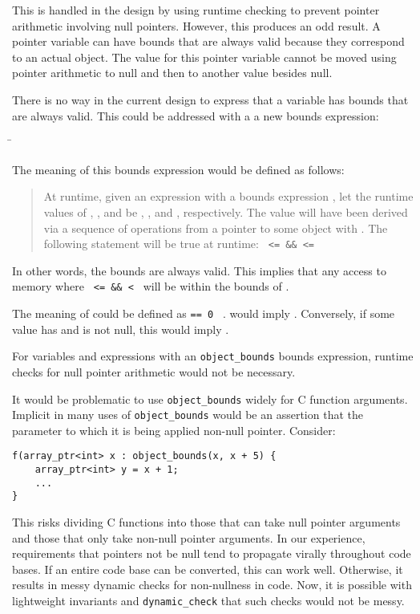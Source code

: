 This is handled in the design by using runtime checking to prevent
pointer arithmetic involving null pointers.  However, this produces
an odd result.  A pointer variable can have bounds that are always
valid because they correspond to an actual object.  The value for
this pointer variable cannot be moved using pointer arithmetic to null
and then to another value besides null.

There is no way in the current design to express that a variable has
bounds that are always valid.  This could be addressed with a 
a new bounds expression:
\begin{tabbing}
\= \\
\>
\end{tabbing}
The meaning of this bounds expression would be defined as follows:
\begin{quote}
At runtime, given an expression  with a bounds expression
, let the
runtime values of , , and  be ,
, and , respectively. The value  will have been derived
via a sequence of operations from a pointer to some object 
with .  The following statement 
will be true at runtime: \texttt{ <=  \&\&
 <= }
\end{quote}
In other words, the bounds are always valid. This implies
that any access to memory where \texttt{ <= 
\&\&  < } will be within the bounds of .

The meaning of 
could be defined as  \texttt{== 0
\textbar{}\textbar{}} .
 would imply .
Conversely, if some value  has  and
 is not null, this would imply .

For variables and expressions with an \texttt{object\_bounds}
bounds expression, runtime checks for null pointer arithmetic
would not be necessary.

It would be problematic to use \texttt{object\_bounds} widely for
C function arguments.   Implicit in many uses of
\texttt{object\_bounds} would be an assertion that the parameter
to which it is being applied  non-null pointer.  Consider:
\begin{verbatim}
f(array_ptr<int> x : object_bounds(x, x + 5) {
    array_ptr<int> y = x + 1;
    ...
}
\end{verbatim}
This risks dividing C functions into those that can
take null pointer arguments and those that only take non-null 
pointer arguments. In our experience, requirements that pointers 
not be null tend to propagate virally throughout code bases.  If an 
entire code base can be  converted, this can work well.  Otherwise, 
it results in messy dynamic checks for non-nullness in code.
Now, it is possible with lightweight invariants and \texttt{dynamic\_check}
that such checks would not be messy.

